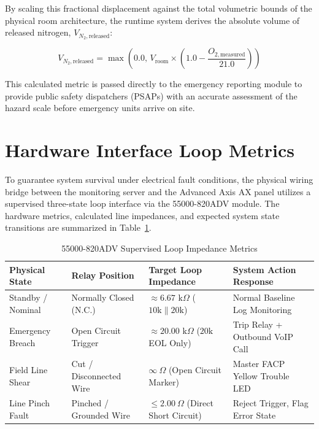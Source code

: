 \documentclass[../master.tex]{subfiles}
\begin{document}
By scaling this fractional displacement against the total volumetric bounds of the physical room architecture, the runtime system derives the absolute volume of released nitrogen, $V_{N_2,\text{released}}$:

\begin{equation}
    V_{N_2,\text{released}} = \max\left(0.0, \, V_{\text{room}} \times \left( 1.0 - \frac{O_{2,\text{measured}}}{21.0} \right)\right)
\end{equation}

This calculated metric is passed directly to the emergency reporting module to provide public safety dispatchers (PSAPs) with an accurate assessment of the hazard scale before emergency units arrive on site.

\section{Hardware Interface Loop Metrics}
To guarantee system survival under electrical fault conditions, the physical wiring bridge between the monitoring server and the Advanced Axis AX panel utilizes a supervised three-state loop interface via the 55000-820ADV module. The hardware metrics, calculated line impedances, and expected system state transitions are summarized in Table~\ref{tab:hardware_loop_specs}.

\begin{table}[htbp]
    \centering
    \caption{55000-820ADV Supervised Loop Impedance Metrics}
    \label{tab:hardware_loop_specs}
    \begin{tabular}{llll}
        \toprule
        \textbf{Physical State} & \textbf{Relay Position} & \textbf{Target Loop Impedance} & \textbf{System Action Response} \\
        \midrule
        Standby / Nominal & Normally Closed (N.C.) & $\approx 6.67\text{ k}\Omega$ ($10\text{k}\parallel20\text{k}$) & Normal Baseline Log Monitoring \\
        Emergency Breach & Open Circuit Trigger & $\approx 20.00\text{ k}\Omega$ ($20\text{k}$ EOL Only) & Trip Relay + Outbound VoIP Call \\
        Field Line Shear & Cut / Disconnected Wire & $\infty\ \Omega$ (Open Circuit Marker) & Master FACP Yellow Trouble LED \\
        Line Pinch Fault & Pinched / Grounded Wire & $\le 2.00\ \Omega$ (Direct Short Circuit) & Reject Trigger, Flag Error State \\
        \bottomrule
    \end{tabular}
\end{table}
\end{document}
